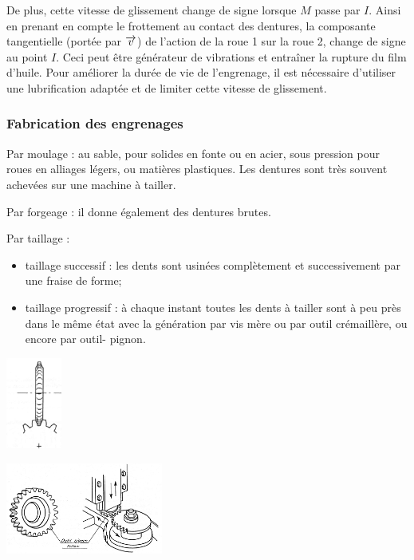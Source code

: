 \documentclass[11pt,oneside]{article}
\begin{document}
De plus, cette vitesse de glissement change de signe lorsque $M$ passe par $I$. Ainsi en prenant en compte le frottement au contact des dentures, la composante tangentielle (portée par $\overrightarrow{v}$) de l’action de la roue 1 sur la roue 2, change de signe au point $I$. Ceci peut être générateur de vibrations et entraîner la rupture du film d’huile. Pour améliorer la durée de vie de l’engrenage, il est nécessaire d’utiliser une lubrification adaptée et de limiter cette vitesse de glissement.

\subsubsection{Fabrication des engrenages}
Par moulage : au sable, pour solides en fonte ou en acier, sous pression pour roues en alliages légers, ou matières plastiques. Les dentures sont très souvent achevées sur une machine à tailler.

Par forgeage : il donne également des dentures brutes.

Par taillage :	
\begin{itemize}
\item taillage successif : les dents sont usinées complètement et successivement par une fraise de forme;
\item taillage progressif : à chaque instant toutes les dents à tailler sont à peu près dans le même état avec la génération par vis mère ou par outil crémaillère, ou encore par outil- pignon.
\end{itemize}

\begin{minipage}[c]{.45\linewidth}
\begin{center}
\includegraphics[height=3cm]{png/fig_59}
\end{center}
\end{minipage} \hfill
\begin{minipage}[c]{.45\linewidth}
\begin{center}
\includegraphics[height=3cm]{png/fig_60}
\end{center}
\end{minipage}
\end{document}
